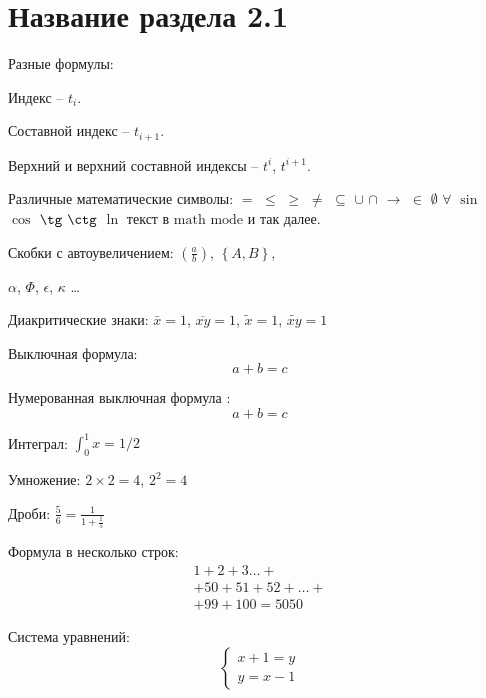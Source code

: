 
%
%
%
%

\begin{singlespace}
   \label{chapt2}
\end{singlespace}

\section{Название раздела 2.1} \label{sect2_1}

Разные формулы:

Индекс -- $t_i$.

Составной индекс -- $t_{i+1}$.

Верхний и верхний составной индексы -- $t^i$, $t^{i+1}$.

Различные математические символы: $=$ $\leq$ $\geq$ $\neq$ $\subseteq$
$\cup$ $\cap$ $\rightarrow$ $\in$ $\emptyset$ $\forall$ $\sin$ $\cos$
$\tg$ $\ctg$ $\ln$ $\text{текст в math mode}$ и так далее.

Скобки с автоувеличением: $\left(\frac{a}{b}\right)$,
$\left\{A,B\right\}$,

$\alpha$, $\Phi$, $\epsilon$, $\kappa$ \dots{}

Диакритические знаки: $\bar x = 1$, $\overline{xy} = 1$,
$\tilde x = 1$, $\widetilde{xy} = 1$

Выключная формула:
\[
  a + b = c
\]

Нумерованная выключная формула :
\begin{equation}\label{eq1}
  a + b = c
\end{equation}

Интеграл: $\int_0^1 x = 1/2$

Умножение: $2 \times 2 = 4$, $2^2 = 4$

Дроби: $\frac{5}{6}=\frac{1}{1+\frac{1}{5}}$

Формула в несколько строк:
\begin{multline}
  1 + 2 + 3 \dots + \\ + 50 + 51 + 52 + \dots + \\ + 99 + 100 = 5050
\end{multline}

Система уравнений:
\[\left\{
    \begin{aligned}
      x+1=y \\
      y=x-1
    \end{aligned}
  \right.
\]

